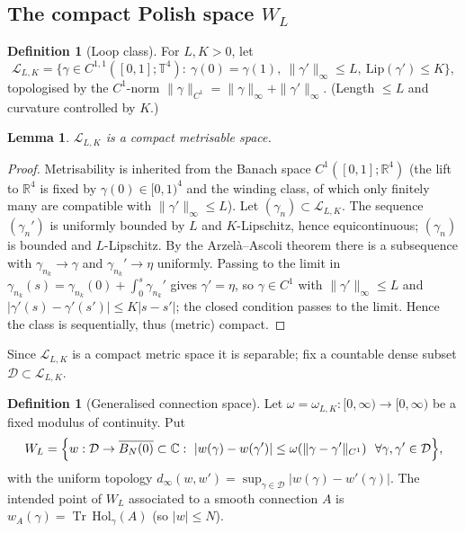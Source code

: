 \documentclass[11pt,a4paper]{article}
\newtheorem{lemma}[theorem]{Lemma}
\theoremstyle{definition}
\newtheorem{definition}[theorem]{Definition}
\theoremstyle{remark}
\newcommand{\R}{\mathbb{R}}
\newcommand{\T}{\mathbb{T}}
\newcommand{\Tr}{\operatorname{Tr}}
\begin{document}
\subsection{The compact Polish space $W_L$}

\begin{definition}[Loop class]\label{def:loops}
For $L,K>0$, let
\begin{equation}
\mathcal L_{L,K}=\bigl\{\gamma\in C^{1,1}([0,1];\T^4):\ \gamma(0)=\gamma(1),\ \|\gamma'\|_\infty\le L,\ \mathrm{Lip}(\gamma')\le K\bigr\},
\end{equation}
topologised by the $C^1$-norm $\|\gamma\|_{C^1}=\|\gamma\|_\infty+\|\gamma'\|_\infty$. (Length $\le L$ and curvature controlled by $K$.)
\end{definition}

\begin{lemma}\label{lem:compactloops}
$\mathcal L_{L,K}$ is a compact metrisable space.
\end{lemma}
\begin{proof}
Metrisability is inherited from the Banach space $C^1([0,1];\R^4)$ (the lift to $\R^4$ is fixed by $\gamma(0)\in[0,1)^4$ and the winding class, of which only finitely many are compatible with $\|\gamma'\|_\infty\le L$). Let $(\gamma_n)\subset\mathcal L_{L,K}$. The sequence $(\gamma_n')$ is uniformly bounded by $L$ and $K$-Lipschitz, hence equicontinuous; $(\gamma_n)$ is bounded and $L$-Lipschitz. By the Arzel\`a--Ascoli theorem there is a subsequence with $\gamma_{n_k}\to\gamma$ and $\gamma_{n_k}'\to\eta$ uniformly. Passing to the limit in $\gamma_{n_k}(s)=\gamma_{n_k}(0)+\int_0^s\gamma_{n_k}'$ gives $\gamma'=\eta$, so $\gamma\in C^1$ with $\|\gamma'\|_\infty\le L$ and $|\gamma'(s)-\gamma'(s')|\le K|s-s'|$; the closed condition passes to the limit. Hence the class is sequentially, thus (metric) compact.
\end{proof}

Since $\mathcal L_{L,K}$ is a compact metric space it is separable; fix a countable dense subset $\mathcal D\subset\mathcal L_{L,K}$.

\begin{definition}[Generalised connection space]\label{def:WL}
Let $\omega=\omega_{L,K}:[0,\infty)\to[0,\infty)$ be a fixed modulus of continuity. Put
\begin{equation}
W_L=\Bigl\{w:\mathcal D\to \overline{B_N(0)}\subset\mathbb C:\ |w(\gamma)-w(\gamma')|\le\omega(\|\gamma-\gamma'\|_{C^1})\ \ \forall \gamma,\gamma'\in\mathcal D\Bigr\},
\end{equation}
with the uniform topology $d_\infty(w,w')=\sup_{\gamma\in\mathcal D}|w(\gamma)-w'(\gamma)|$. The intended point of $W_L$ associated to a smooth connection $A$ is $w_A(\gamma)=\Tr\,\mathrm{Hol}_\gamma(A)$ (so $|w|\le N$).
\end{definition}
\end{document}
